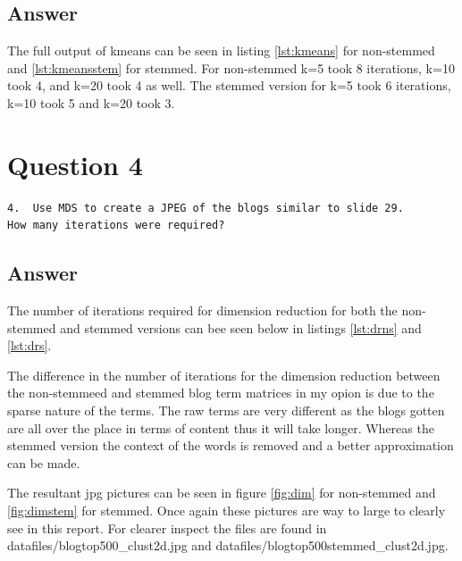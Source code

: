 \documentclass[letterpaper,10pt]{article}
\begin{document}
\subsection*{Answer}
The full output of kmeans can be seen in listing \hyperref[lst:kmeans]{\ref{lst:kmeans}} for non-stemmed and \hyperref[lst:kmeansstem]{\ref{lst:kmeansstem}} for stemmed. For non-stemmed k=5 took 8 iterations, k=10 took 4, and k=20 took 4 as well. The stemmed version for k=5 took 6 iterations, k=10 took 5 and k=20 took 3.

\newpage


\newpage
\section*{Question 4}
\begin{verbatim}
4.  Use MDS to create a JPEG of the blogs similar to slide 29.  
How many iterations were required?
\end{verbatim}
\subsection*{Answer}
The number of iterations required for dimension reduction for both the non-stemmed and stemmed versions can bee seen below in listings \hyperref[lst:drns]{\ref{lst:drns}} and \hyperref[lst:drs]{\ref{lst:drs}}.



The difference in the number of iterations for the dimension reduction between the non-stemmeed and stemmed blog term matrices in my opion is due to the sparse nature of the terms. The raw terms are very different as the blogs gotten are all over the place in terms of content thus it will take longer. Whereas the stemmed version the context of the words is removed and a better approximation can be made. 

The resultant jpg pictures can be seen in figure \hyperref[fig:dim]{\ref{fig:dim}} for non-stemmed and \hyperref[fig:dimstem]{\ref{fig:dimstem}} for stemmed. Once again these pictures are way to large to clearly see in this report. For clearer inspect the files are found in datafiles/blogtop500\_clust2d.jpg and datafiles/blogtop500stemmed\_clust2d.jpg. 
\end{document}

